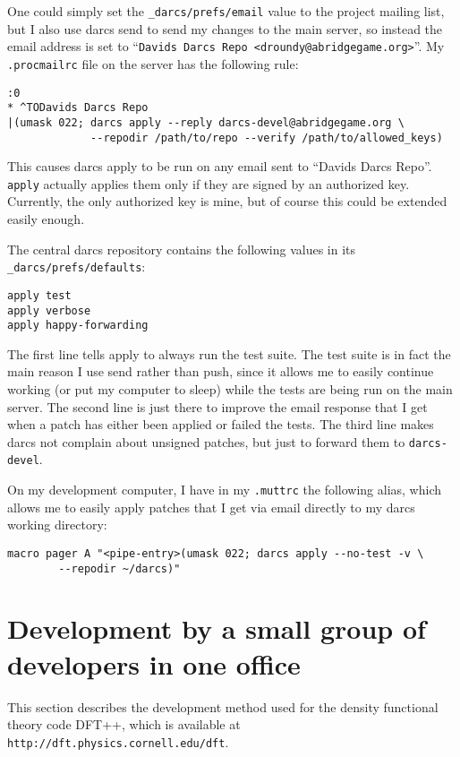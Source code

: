 One could simply set the \verb!_darcs/prefs/email! value to the project
mailing list, but I also use darcs send to send my changes to the main
server, so instead the email address is set to
``\verb!Davids Darcs Repo <droundy@abridgegame.org>!''.  My
\verb-.procmailrc-
file on the server has the following rule:
\begin{verbatim}
:0
* ^TODavids Darcs Repo
|(umask 022; darcs apply --reply darcs-devel@abridgegame.org \
             --repodir /path/to/repo --verify /path/to/allowed_keys)
\end{verbatim}
This causes darcs apply to be run on any email sent to ``Davids Darcs
Repo''.
\verb'apply' actually applies them only if they are signed by an
authorized key.  Currently, the only authorized key is mine, but of course
this could be extended easily enough.

The central darcs repository contains the following values in its
\verb!_darcs/prefs/defaults!:
\begin{verbatim}
apply test
apply verbose
apply happy-forwarding
\end{verbatim}
The first line tells apply to always run the test suite.  The test suite is
in fact the main reason I use send rather than push, since it allows me to
easily continue working (or put my computer to sleep) while the tests are
being run on the main server.  The second line is just there to improve the
email response that I get when a patch has either been applied or failed
the tests.  The third line makes darcs not complain about unsigned patches,
but just to forward them to \verb!darcs-devel!.

On my development computer, I have in my \verb!.muttrc! the following
alias, which allows me to easily apply patches that I get via email
directly to my darcs working directory:
\begin{verbatim}
macro pager A "<pipe-entry>(umask 022; darcs apply --no-test -v \
        --repodir ~/darcs)"
\end{verbatim}


\section{Development by a small group of developers in one office}
\label{dft-development-practices}

This section describes the development method used for the density
functional theory code DFT++, which is available at
\verb!http://dft.physics.cornell.edu/dft!.

